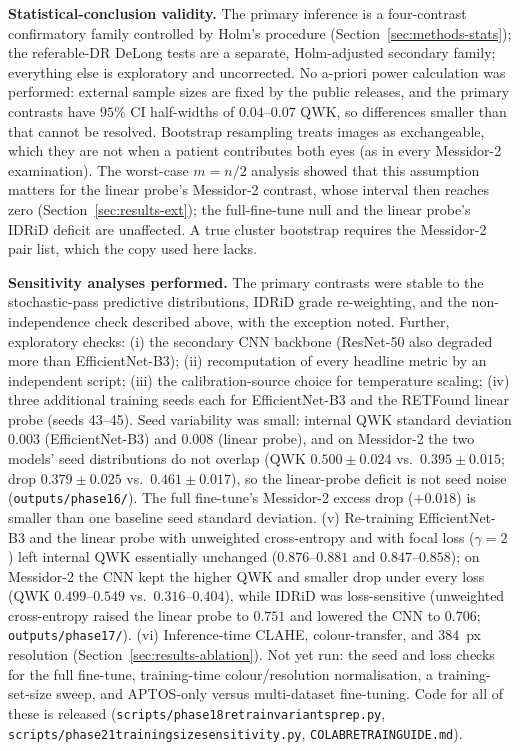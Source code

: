 \documentclass[journal]{IEEEtran}
\renewcommand{\_}{\origunderscore\allowbreak}
\begin{document}
\textbf{Statistical-conclusion validity.} The primary inference is a
four-contrast confirmatory family controlled by Holm's procedure
(Section~\ref{sec:methods-stats}); the referable-DR DeLong tests are a separate,
Holm-adjusted secondary family; everything else is exploratory and uncorrected.
No a-priori power calculation was performed: external sample sizes are fixed by
the public releases, and the primary contrasts have $95\%$ CI half-widths of
$0.04$--$0.07$ QWK, so differences smaller than that cannot be resolved.
Bootstrap resampling treats images as exchangeable, which they are not when a
patient contributes both eyes (as in every Messidor-2 examination). The
worst-case $m=n/2$ analysis showed that this assumption matters for the
linear probe's Messidor-2 contrast, whose interval then reaches zero
(Section~\ref{sec:results-ext}); the full-fine-tune null and the linear probe's
IDRiD deficit are unaffected. A true cluster bootstrap requires the Messidor-2
pair list, which the copy used here lacks.

\textbf{Sensitivity analyses performed.} The primary contrasts were stable to the
stochastic-pass predictive distributions, IDRiD grade re-weighting, and the
non-independence check described above, with the exception noted. Further,
exploratory checks: (i) the secondary CNN backbone (ResNet-50 also degraded more
than EfficientNet-B3); (ii) recomputation of every headline metric by an
independent script; (iii) the calibration-source choice for temperature scaling;
(iv) three additional training seeds each for EfficientNet-B3 and the RETFound
linear probe (seeds 43--45). Seed variability was small: internal QWK standard
deviation $0.003$ (EfficientNet-B3) and $0.008$ (linear probe), and on
Messidor-2 the two models' seed distributions do not overlap (QWK $0.500 \pm 0.024$
vs.\ $0.395 \pm 0.015$; drop $0.379 \pm 0.025$ vs.\ $0.461 \pm 0.017$), so the
linear-probe deficit is not seed noise (\texttt{outputs/\allowbreak{}phase16/}). The
full fine-tune's Messidor-2 excess drop ($+0.018$) is smaller than one baseline
seed standard deviation. (v) Re-training EfficientNet-B3 and the linear probe
with unweighted cross-entropy and with focal loss ($\gamma=2$) left internal QWK
essentially unchanged ($0.876$--$0.881$ and $0.847$--$0.858$); on Messidor-2 the
CNN kept the higher QWK and smaller drop under every loss (QWK $0.499$--$0.549$
vs.\ $0.316$--$0.404$), while IDRiD was loss-sensitive (unweighted cross-entropy
raised the linear probe to $0.751$ and lowered the CNN to $0.706$;
\texttt{outputs/\allowbreak{}phase17/}). (vi) Inference-time CLAHE, colour-transfer, and
$384$~px resolution (Section~\ref{sec:results-ablation}). Not yet run: the seed and
loss checks for the full fine-tune, training-time colour/resolution
normalisation, a training-set-size sweep, and APTOS-only versus multi-dataset
fine-tuning. Code for all of these is released
(\texttt{scripts/\allowbreak{}phase18\_retrain\_variants\_prep.py},
\texttt{scripts/\allowbreak{}phase21\_training\_size\_sensitivity.py},
\texttt{COLAB\_RETRAIN\_GUIDE.md}).
\end{document}
